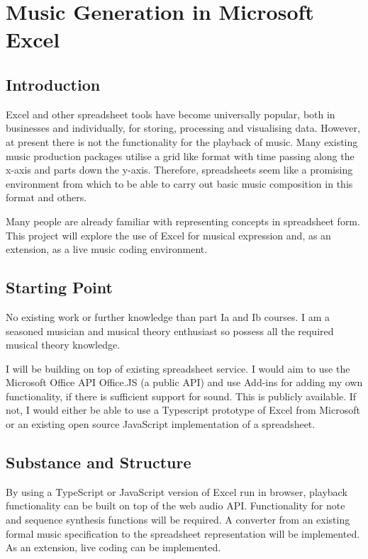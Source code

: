 \documentclass[]{article}
\date{}
\begin{document}
\section{Music Generation in Microsoft Excel}\label{header-n3}

\subsection{Introduction}\label{header-n6}

Excel and other spreadsheet tools have become universally popular, both
in businesses and individually, for storing, processing and visualising
data. However, at present there is not the functionality for the
playback of music. Many existing music production packages utilise a
grid like format with time passing along the x-axis and parts down the
y-axis. Therefore, spreadsheets seem like a promising environment from
which to be able to carry out basic music composition in this format and
others.

Many people are already familiar with representing concepts in
spreadsheet form. This project will explore the use of Excel for musical
expression and, as an extension, as a live music coding environment.

\subsection{Starting Point}\label{header-n9}

No existing work or further knowledge than part Ia and Ib courses. I am
a seasoned musician and musical theory enthusiast so possess all the
required musical theory knowledge.

I will be building on top of existing spreadsheet service. I would aim
to use the Microsoft Office API Office.JS (a public API) and use Add-ins
for adding my own functionality, if there is sufficient support for
sound. This is publicly available. If not, I would either be able to use
a Typescript prototype of Excel from Microsoft or an existing open
source JavaScript implementation of a spreadsheet.

\subsection{Substance and Structure}\label{header-n12}

By using a TypeScript or JavaScript version of Excel run in browser,
playback functionality can be built on top of the web audio API.
Functionality for note and sequence synthesis functions will be
required. A converter from an existing formal music specification to the
spreadsheet representation will be implemented. As an extension, live
coding can be implemented.
\end{document}
